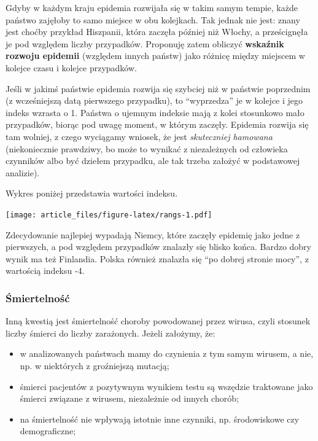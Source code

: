 \documentclass[
]{article}
\providecommand{\tightlist}{%
  \setlength{\itemsep}{0pt}\setlength{\parskip}{0pt}}
\begin{document}
Gdyby w każdym kraju epidemia rozwijała się w takim samym tempie, każde
państwo zajęłoby to samo miejsce w obu kolejkach. Tak jednak nie jest:
znany jest choćby przykład Hiszpanii, która zaczęła później niż Włochy,
a prześcignęła je pod względem liczby przypadków. Proponuję zatem
obliczyć \textbf{wskaźnik rozwoju epidemii} (względem innych państw)
jako różnicę między miejscem w kolejce czasu i kolejce przypadków.

Jeśli w jakimś państwie epidemia rozwija się szybciej niż w państwie
poprzednim (z wcześniejszą datą pierwszego przypadku), to ``wyprzedza''
je w kolejce i jego indeks wzrasta o 1. Państwa o ujemnym indeksie mają
z kolei stosunkowo mało przypadków, biorąc pod uwagę moment, w którym
zaczęły. Epidemia rozwija się tam wolniej, z czego wyciągamy wniosek, że
jest \emph{skuteczniej hamowana} (niekoniecznie prawdziwy, bo może to
wynikać z niezależnych od człowieka czynników albo być dziełem
przypadku, ale tak trzeba założyć w podstawowej analizie).

Wykres poniżej przedstawia wartości indeksu.

\texttt{[image: article\_files/figure-latex/rangs-1.pdf]}

Zdecydowanie najlepiej wypadają Niemcy, które zaczęły epidemię jako
jedne z pierwszych, a pod względem przypadków znalazły się blisko końca.
Bardzo dobry wynik ma też Finlandia. Polska również znalazła się ``po
dobrej stronie mocy'', z wartością indeksu -4.

\hypertarget{ux15bmiertelnoux15bux107}{%
\subsubsection{Śmiertelność}\label{ux15bmiertelnoux15bux107}}

Inną kwestią jest śmiertelność choroby powodowanej przez wirusa, czyli
stosunek liczby śmierci do liczby zarażonych. Jeżeli założymy, że:

\begin{itemize}
\tightlist
\item
  w analizowanych państwach mamy do czynienia z tym samym wirusem, a
  nie, np. w niektórych z groźniejszą mutacją;
\item
  śmierci pacjentów z pozytywnym wynikiem testu są wszędzie traktowane
  jako śmierci związane z wirusem, niezależnie od innych chorób;
\item
  na śmiertelność nie wpływają istotnie inne czynniki, np. środowiskowe
  czy demograficzne;
\end{itemize}
\end{document}
